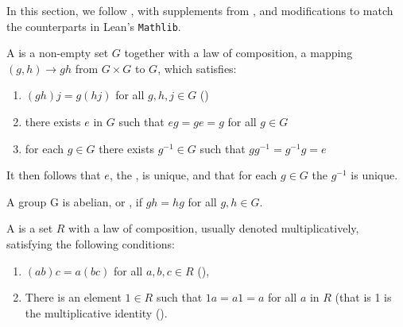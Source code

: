 
In this section, we follow \cite{jadczyk2019notes}, with supplements from \cite{garling2011clifford, chen2016infinitely}, 
and modifications to match the counterparts in Lean's \texttt{Mathlib}.

\begin{definition}[Group]
    \label{Group}
    \leanok

    A  is a non-empty set $G$ together with a law of composition, a mapping $(g, h) \to gh$ from $G \times G$ to $G$, which satisfies:

    \begin{enumerate}
    \item $(g h) j = g (h j)$ for all $g, h, j \in G$ ()
    \item there exists $e$ in $G$ such that $e g = g e = g$ for all $g \in G$
    \item for each $g \in G$ there exists $g^{-1} \in G$ such that $g g^{-1} = g^{-1} g = e$

    \end{enumerate}

\end{definition}

\begin{remark}
    \label{mk:Group}
    
    It then follows that $e$, the , is unique, and that for each $g \in G$ the  $g^{-1}$ is unique.

    A group G is abelian, or , if $g h = h g$ for all $g, h \in G$.

\end{remark}

\begin{definition}[Monoid]
    \label{Monoid}
    \leanok

    A  is a set $R$ with a law of composition, usually denoted multiplicatively, 
    satisfying the following conditions:

    \begin{enumerate}
    \item $(a b) c = a (b c)$ for all $a, b, c \in R$ (),

    \item There is an element $1 \in R$ such that $1 a = a 1 = a$ for all $a$ in $R$ (that is 1 is the multiplicative identity ().

    \end{enumerate}

\end{definition}

